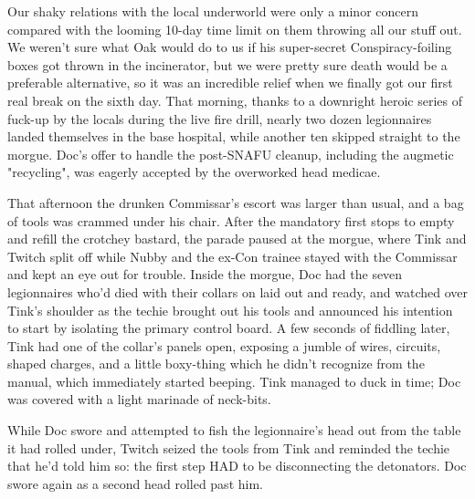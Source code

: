 Our shaky relations with the local underworld were only a minor concern compared with the looming 10-day time limit on them throwing all our stuff out. 
We weren't sure what Oak would do to us if his super-secret Conspiracy-foiling boxes got thrown in the incinerator, but we were pretty sure death would be a preferable alternative, so it was an incredible relief when we finally got our first real break on the sixth day. 
That morning, thanks to a downright heroic series of fuck-up by the locals during the live fire drill, nearly two dozen legionnaires landed themselves in the base hospital, while another ten skipped straight to the morgue. 
Doc's offer to handle the post-SNAFU cleanup, including the augmetic "recycling", was eagerly accepted by the overworked head medicae.

That afternoon the drunken Commissar's escort was larger than usual, and a bag of tools was crammed under his chair. 
After the mandatory first stops to empty and refill the crotchey bastard, the parade paused at the morgue, where Tink and Twitch split off while Nubby and the ex-Con trainee stayed with the Commissar and kept an eye out for trouble. 
Inside the morgue, Doc had the seven legionnaires who'd died with their collars on laid out and ready, and watched over Tink's shoulder as the techie brought out his tools and announced his intention to start by isolating the primary control board. 
A few seconds of fiddling later, Tink had one of the collar's panels open, exposing a jumble of wires, circuits, shaped charges, and a little boxy-thing which he didn't recognize from the manual, which immediately started beeping. 
Tink managed to duck in time; 
Doc was covered with a light marinade of neck-bits.

While Doc swore and attempted to fish the legionnaire's head out from the table it had rolled under, Twitch seized the tools from Tink and reminded the techie that he'd told him so: 
the first step HAD to be disconnecting the detonators. 
Doc swore again as a second head rolled past him.


